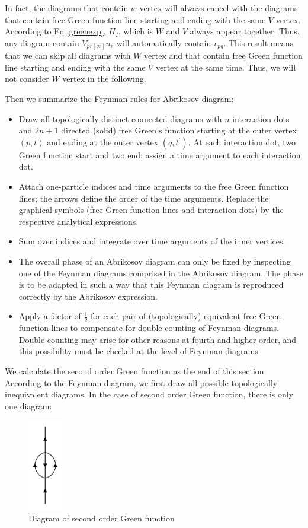 In fact, the diagrams that contain $w$ vertex will always cancel with the diagrams that contain free Green function line starting and ending with the same $V$ vertex.
According to Eq \ref{greenexp}, $H_I$, which is $W$ and $V$ always appear together.
Thus, any diagram contain $V_{pr[qr]}n_r$ will automatically contain $r_{pq}$.
This result means that we can skip all diagrams with $W$ vertex and that contain free Green function line starting and ending with the same $V$ vertex at the same time.
Thus, we will not consider $W$ vertex in the following.

Then we summarize the Feynman rules for Abrikosov diagram:
\begin{itemize}
	\item Draw all topologically distinct connected diagrams with $n$ interaction dots and $2n + 1$ directed (solid) free Green’s function starting at the outer vertex $(p, t)$ and ending at the outer vertex $(q, t^{\prime})$.
		At each interaction dot, two Green function start and two end; assign a time argument to each interaction dot.
	\item Attach one-particle indices and time arguments to the free Green function lines; the arrows define the order of the time arguments. Replace the graphical symbols (free Green function lines and interaction dots) by the respective analytical expressions.
	\item Sum over indices and integrate over time arguments of the inner vertices.
	\item The overall phase of an Abrikosov diagram can only be fixed by inspecting one of the Feynman diagrams comprised in the Abrikosov diagram.
		The phase is to be adapted in such a way that this Feynman diagram is reproduced correctly by the Abrikosov expression.
	\item Apply a factor of $\frac{1}{2}$ for each pair of (topologically) equivalent free Green function lines to compensate for double counting of Feynman diagrams. Double counting may arise for other reasons at fourth and higher order, and this possibility must be checked at the level of Feynman diagrams.
\end{itemize}

We calculate the second order Green function as the end of this section:
According to the Feynman diagram, we first draw all possible topologically inequivalent diagrams.
In the case of second order Green function, there is only one diagram:
\begin{figure}[h]
	\centering
	\includegraphics[height=4cm]{figures/order2.png}
	\caption{Diagram of second order Green function}
\end{figure}

